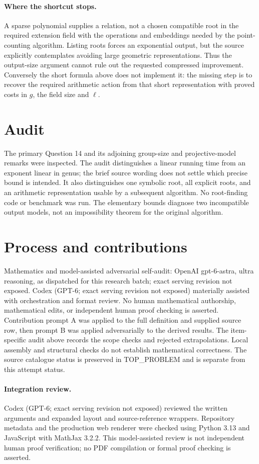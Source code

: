 \documentclass[11pt]{article}
\begin{document}
\paragraph{Where the shortcut stops.}
A sparse polynomial supplies a relation, not a chosen compatible
root in the required extension field with the operations and embeddings
needed by the point-counting algorithm. Listing roots forces an
exponential output, but the source explicitly contemplates avoiding
large geometric representations. Thus the output-size argument cannot
rule out the requested compressed improvement. Conversely the short
formula above does not implement it: the missing step is to recover
the required arithmetic action from that short representation with
proved costs in $g$, the field size and $\ell$.

\section{Audit}
The primary Question 14 and its adjoining group-size and projective-model
remarks were inspected. The audit distinguishes a linear running time
from an exponent linear in genus; the brief source wording does not
settle which precise bound is intended. It also distinguishes one
symbolic root, all explicit roots, and an arithmetic representation
usable by a subsequent algorithm. No root-finding code or benchmark
was run. The elementary bounds diagnose two incompatible output
models, not an impossibility theorem for the original algorithm.

\section{Process and contributions}
Mathematics and model-assisted adversarial self-audit: OpenAI gpt-6-astra, ultra reasoning, as dispatched for this research batch; exact serving revision not exposed. Codex (GPT-6; exact serving revision not exposed) materially assisted with orchestration and format review. No human mathematical authorship, mathematical edits, or independent human proof checking is asserted.
Contribution prompt A was applied to the full definition and supplied source row, then prompt B was applied adversarially to the derived results. The item-specific audit above records the scope checks and rejected extrapolations. Local assembly and structural checks do not establish mathematical correctness. The source catalogue status is preserved in TOP\_PROBLEM and is separate from this attempt status.
\paragraph{Integration review.} Codex (GPT-6; exact serving revision not exposed) reviewed the written arguments and expanded layout and source-reference wrappers. Repository metadata and the production web renderer were checked using Python 3.13 and JavaScript with MathJax 3.2.2. This model-assisted review is not independent human proof verification; no PDF compilation or formal proof checking is asserted.
\end{document}
